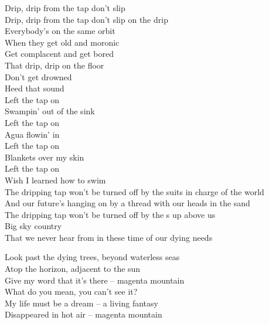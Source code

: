 Drip, drip from the tap don't slip\\
Drip, drip from the tap don't slip on the drip\\

Everybody's on the same orbit\\
When they get old and moronic\\
Get complacent and get bored\\
That drip, drip on the floor\\

Don't get drowned\\
Heed that sound\\

Left the tap on\\
Swampin' out of the sink\\
Left the tap on\\
Agua flowin' in\\
Left the tap on\\
Blankets over my skin\\
Left the tap on\\
Wish I learned how to swim\\

The dripping tap won't be turned off by the suits in charge of the world\\
And our future's hanging on by a thread with our heads in the sand\\
The dripping tap won't be turned off by the s up above us\\
Big sky country\\
That we never hear from in these time of our dying needs\\




Look past the dying trees, beyond waterless seas\\
Atop the horizon, adjacent to the sun\\
Give my word that it's there -- magenta mountain\\

What do you mean, you can't see it?\\
My life must be a dream -- a living fantasy\\
Disappeared in hot air -- magenta mountain\\

